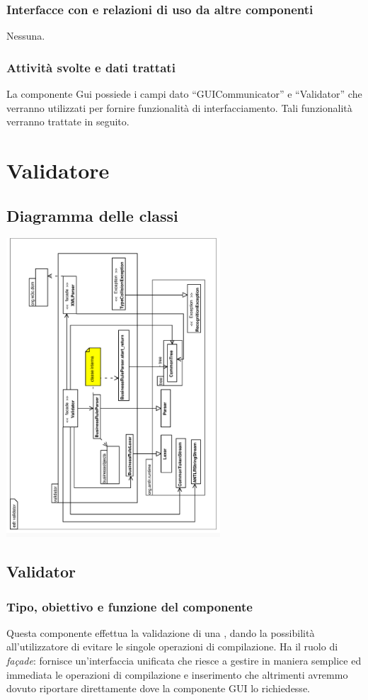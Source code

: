 \documentclass[11pt,titlepage,a4paper]{report}
\begin{document}
\subsubsection{Interfacce con e relazioni di uso da altre componenti}
Nessuna.
\subsubsection{Attivit\`a svolte e dati trattati}
La componente Gui possiede i campi dato ``GUICommunicator'' e ``Validator'' che verranno utilizzati per fornire funzionalit\`a di interfacciamento. Tali funzionalit\`a verranno trattate in seguito.

\section{Validatore}
\subsection{Diagramma delle classi}
\begin{center}
\includegraphics[width=0.6\textwidth, angle=-90]{DiagrammaClassi/validator.eps}
\end{center}
\subsection{Validator}%
\subsubsection{Tipo, obiettivo e funzione del componente}
Questa componente effettua la validazione di una \br, dando la possibilit\`a all'utilizzatore di evitare le singole operazioni di compilazione. Ha il ruolo di \textit{fa\c{c}ade}: fornisce un'interfaccia unificata che riesce a gestire in maniera semplice ed immediata le operazioni di compilazione e inserimento che altrimenti avremmo dovuto riportare direttamente dove la componente GUI lo richiedesse.
\end{document}
